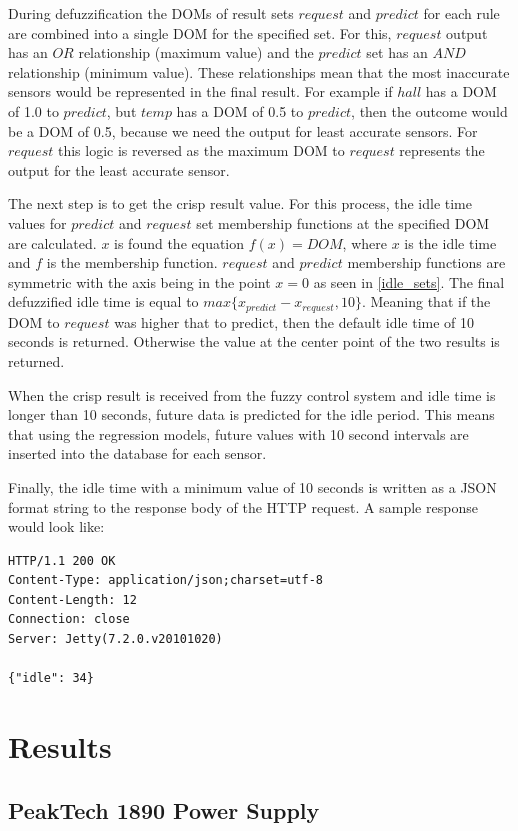 During defuzzification the DOMs of result sets $request$ and $predict$ for each rule are combined into a single DOM for the specified set. For this, $request$ output has an $OR$ relationship (maximum value) and the $predict$ set has an $AND$ relationship (minimum value). These relationships mean that the most inaccurate sensors would be represented in the final result. For example if $hall$ has a DOM of 1.0 to $predict$, but $temp$ has a DOM of 0.5 to $predict$, then the outcome would be a DOM of 0.5, because we need the output for least accurate sensors. For $request$ this logic is reversed as the maximum DOM to $request$ represents the output for the least accurate sensor. 

The next step is to get the crisp result value. For this process, the idle time values for $predict$ and $request$ set membership functions at the specified DOM are calculated. $x$ is found the equation $f(x) = DOM$, where $x$ is the idle time and $f$ is the membership function. $request$ and $predict$ membership functions are symmetric with the axis being in the point $x = 0$ as seen in \autoref{idle_sets}. The final defuzzified idle time is equal to $max\{x_{predict} - x_{request}, 10\}$. Meaning that if the DOM to $request$ was higher that to predict, then the default idle time of 10 seconds is returned. Otherwise the value at the center point of the two results is returned.

When the crisp result is received from the fuzzy control system and idle time is longer than 10 seconds, future data is predicted for the idle period. This means that using the regression models, future values with 10 second intervals are inserted into the database for each sensor. 

Finally, the idle time with a minimum value of 10 seconds is written as a JSON format string to the response body of the HTTP request. A sample response would look like:

\begin{lstlisting}
HTTP/1.1 200 OK
Content-Type: application/json;charset=utf-8
Content-Length: 12
Connection: close
Server: Jetty(7.2.0.v20101020)

{"idle": 34}
\end{lstlisting}

\section{Results}

\subsection{PeakTech 1890 Power Supply}

